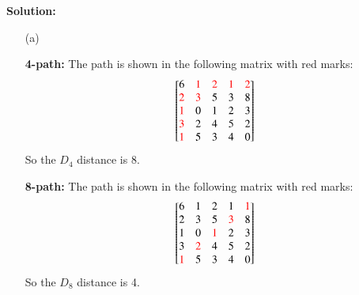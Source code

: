 \documentclass[11pt,letterpaper]{article}
\renewcommand{\r}[1]{\textcolor{red}{#1}}
\begin{document}
\textbf{Solution:}
\begin{itemize}
	\item [(a)]\par {\bf 4-path:} The path is shown in the following matrix with red marks:
	\[\begin{bmatrix}
		6 & \r{1} & \r{2} & \r{1} & \r{2}\\ 
		\r{2} & \r{3} & 5 & 3 & 8\\ 
		\r{1} & 0 & 1 & 2 & 3\\ 
		\r{3} & 2 & 4 & 5 & 2\\ 
		\r{1} & 5 & 3 & 4 & 0
		\end{bmatrix}\] So the $D_4$ distance is 8.
	
	\par {\bf 8-path:} The path is shown in the following matrix with red marks:
	\[\begin{bmatrix}
		6 & 1 & 2 & 1 & \r{1}\\ 
		2 & 3 & 5 & \r{3} & 8\\ 
		1 & 0 & \r{1} & 2 & 3\\ 
		3 & \r{2} & 4 & 5 & 2\\ 
		\r{1} & 5 & 3 & 4 & 0
		\end{bmatrix}\] So the $D_8$ distance is 4.
	

\end{itemize}
\end{document}
